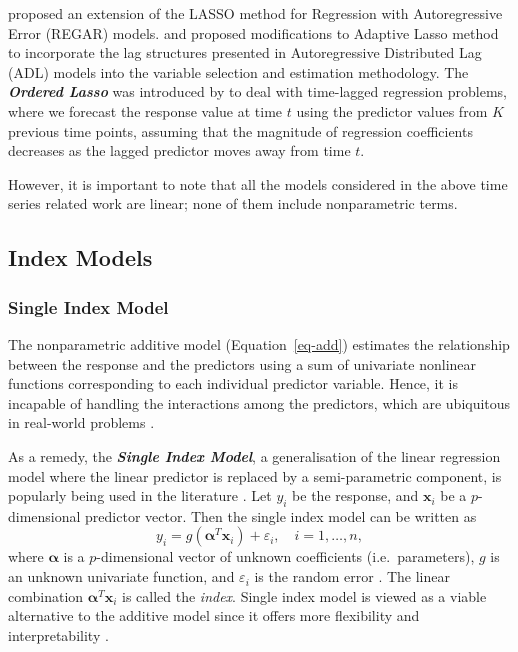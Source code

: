 \documentclass[11pt,a4paper,]{article}
\begin{document}
\textcite{Wang2007} proposed an extension of the LASSO method for
Regression with Autoregressive Error (REGAR) models. \textcite{Park2013}
and \textcite{Konzen2016} proposed modifications to Adaptive Lasso
method to incorporate the lag structures presented in Autoregressive
Distributed Lag (ADL) models into the variable selection and estimation
methodology. The \textbf{\emph{Ordered Lasso}} was introduced by
\textcite{Tibshirani2016} to deal with time-lagged regression problems,
where we forecast the response value at time \(t\) using the predictor
values from \(K\) previous time points, assuming that the magnitude of
regression coefficients decreases as the lagged predictor moves away
from time \(t\).

However, it is important to note that all the models considered in the
above time series related work are linear; none of them include
nonparametric terms.

\hypertarget{sec-Index}{%
\subsection{Index Models}\label{sec-Index}}

\hypertarget{single-index-model}{%
\subsubsection{Single Index Model}\label{single-index-model}}

The nonparametric additive model (Equation~\ref{eq-add}) estimates the
relationship between the response and the predictors using a sum of
univariate nonlinear functions corresponding to each individual
predictor variable. Hence, it is incapable of handling the interactions
among the predictors, which are ubiquitous in real-world problems
\autocite{Zhang2008}.

As a remedy, the \textbf{\emph{Single Index Model}}, a generalisation of
the linear regression model where the linear predictor is replaced by a
semi-parametric component, is popularly being used in the literature
\autocite{Radchenko2015}. Let \(y_{i}\) be the response, and
\(\bm{x}_{i}\) be a \(p\)-dimensional predictor vector. Then the single
index model can be written as \[
  y_{i} = g \left ( \bm{\alpha}^{T} \bm{x}_{i} \right ) + \varepsilon_{i}, \quad i = 1, \dots, n,
\] where \(\bm{\alpha}\) is a \(p\)-dimensional vector of unknown
coefficients (i.e.~parameters), \(g\) is an unknown univariate function,
and \(\varepsilon_{i}\) is the random error
\autocite{Stoker1986,Hardle1993}. The linear combination
\(\bm{\alpha}^{T} \bm{x}_{i}\) is called the \emph{index}. Single index
model is viewed as a viable alternative to the additive model since it
offers more flexibility and interpretability \autocite{Radchenko2015}.
\end{document}
